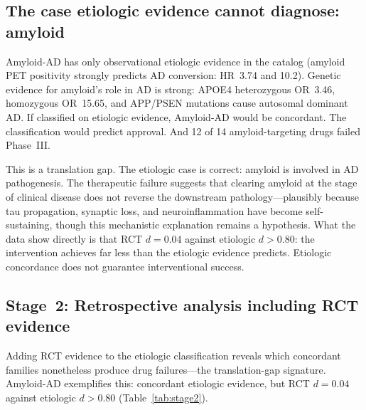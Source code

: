 \documentclass[11pt]{article}
\begin{document}
\subsection{The case etiologic evidence cannot diagnose: amyloid}
\label{sec:amyloid}

Amyloid-AD has only observational etiologic evidence in the catalog (amyloid PET positivity strongly predicts AD conversion: HR~3.74 and 10.2). Genetic evidence for amyloid's role in AD is strong: APOE4 heterozygous OR~3.46, homozygous OR~15.65, and APP/PSEN mutations cause autosomal dominant AD. If classified on etiologic evidence, Amyloid-AD would be concordant. The classification would predict approval. And 12 of 14 amyloid-targeting drugs failed Phase~III.

This is a translation gap. The etiologic case is correct: amyloid is involved in AD pathogenesis. The therapeutic failure suggests that clearing amyloid at the stage of clinical disease does not reverse the downstream pathology---plausibly because tau propagation, synaptic loss, and neuroinflammation have become self-sustaining, though this mechanistic explanation remains a hypothesis. What the data show directly is that RCT $d = 0.04$ against etiologic $d > 0.80$: the intervention achieves far less than the etiologic evidence predicts. Etiologic concordance does not guarantee interventional success.

\subsection{Stage~2: Retrospective analysis including RCT evidence}
\label{sec:stage2}

Adding RCT evidence to the etiologic classification reveals which concordant families nonetheless produce drug failures---the translation-gap signature. Amyloid-AD exemplifies this: concordant etiologic evidence, but RCT $d = 0.04$ against etiologic $d > 0.80$ (Table~\ref{tab:stage2}).
\end{document}
